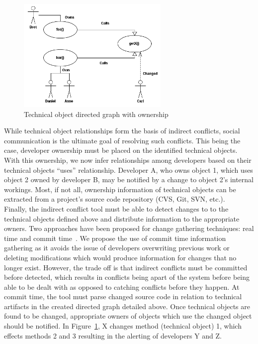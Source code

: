 \documentclass[conference]{IEEEtran}
\begin{document}
\begin{figure}[t!]
\includegraphics{images/CallGraph}
\caption{Technical object directed graph with ownership\label{fig:graph}}
\end{figure}

While technical object relationships form the basis of indirect conflicts,
social communication is the ultimate goal of resolving such conflicts.
This being the case, developer ownership must be placed on the 
identified technical objects. With this ownership, we now infer
relationships among developers based on their technical objects
``uses'' relationship. Developer A, who owns object 1, which uses 
object 2 owned by developer B, may be notified by a change to
object 2's internal workings. Most, if not all, ownership information
of technical objects can be extracted from a project's source code
repository (CVS, Git, SVN, etc.).\\

Finally, the indirect conflict tool must be able to detect changes to
to the technical objects defined above and distribute information 
to the appropriate owners. Two approaches have been 
proposed for change gathering techniques: real time and commit 
time~\cite{Fitzpatrick:2002:SPA}.
We propose the use of commit time
information gathering as it avoids the issue of developers 
overwriting previous work or deleting modifications which would 
produce information for changes that no longer exist. However, the
trade off is that indirect conflicts must be committed before detected,
which results in conflicts being apart of the system before being able
to be dealt with as opposed to catching conflicts before they happen.
At commit time, the tool must parse changed source code in relation
to technical artifacts in the created directed graph detailed above.
Once technical objects are found to be changed, appropriate owners
of objects which use the changed object should be notified.
In Figure~\ref{fig:graph}, X changes method (technical object) 1,
which effects methods 2 and 3 resulting in the alerting of
developers Y and Z.
\end{document}
